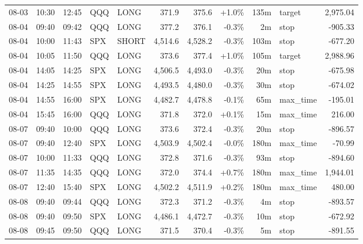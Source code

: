 \documentclass[11pt,a4paper,twoside]{article}
\begin{document}
\begin{center}
\begin{longtable}{>{\color{txtmain}}l l l l l r r r r >{\color{txtmain}}l r}
08-03 & 10:30 & 12:45 & QQQ & LONG & 371.9 & 375.6 & \textcolor{wingreen}{+1.0\%} & 135m & target & \textcolor{wingreen}{2,975.04} \\
08-04 & 09:40 & 09:42 & QQQ & LONG & 377.2 & 376.1 & \textcolor{lossred}{-0.3\%} & 2m & stop & \textcolor{lossred}{-905.33} \\
08-04 & 10:00 & 11:43 & SPX & SHORT & 4,514.6 & 4,528.2 & \textcolor{lossred}{-0.3\%} & 103m & stop & \textcolor{lossred}{-677.20} \\
08-04 & 10:05 & 11:50 & QQQ & LONG & 373.6 & 377.4 & \textcolor{wingreen}{+1.0\%} & 105m & target & \textcolor{wingreen}{2,988.96} \\
08-04 & 14:05 & 14:25 & SPX & LONG & 4,506.5 & 4,493.0 & \textcolor{lossred}{-0.3\%} & 20m & stop & \textcolor{lossred}{-675.98} \\
08-04 & 14:25 & 14:55 & SPX & LONG & 4,493.5 & 4,480.0 & \textcolor{lossred}{-0.3\%} & 30m & stop & \textcolor{lossred}{-674.02} \\
08-04 & 14:55 & 16:00 & SPX & LONG & 4,482.7 & 4,478.8 & \textcolor{lossred}{-0.1\%} & 65m & max\_time & \textcolor{lossred}{-195.01} \\
08-04 & 15:45 & 16:00 & QQQ & LONG & 371.8 & 372.0 & \textcolor{wingreen}{+0.1\%} & 15m & max\_time & \textcolor{wingreen}{216.00} \\
08-07 & 09:40 & 10:00 & QQQ & LONG & 373.6 & 372.4 & \textcolor{lossred}{-0.3\%} & 20m & stop & \textcolor{lossred}{-896.57} \\
08-07 & 09:40 & 12:40 & SPX & LONG & 4,503.9 & 4,502.4 & \textcolor{lossred}{-0.0\%} & 180m & max\_time & \textcolor{lossred}{-70.99} \\
08-07 & 10:00 & 11:33 & QQQ & LONG & 372.8 & 371.6 & \textcolor{lossred}{-0.3\%} & 93m & stop & \textcolor{lossred}{-894.60} \\
08-07 & 11:35 & 14:35 & QQQ & LONG & 372.0 & 374.4 & \textcolor{wingreen}{+0.7\%} & 180m & max\_time & \textcolor{wingreen}{1,944.01} \\
08-07 & 12:40 & 15:40 & SPX & LONG & 4,502.2 & 4,511.9 & \textcolor{wingreen}{+0.2\%} & 180m & max\_time & \textcolor{wingreen}{480.00} \\
08-08 & 09:40 & 09:44 & QQQ & LONG & 372.3 & 371.2 & \textcolor{lossred}{-0.3\%} & 4m & stop & \textcolor{lossred}{-893.57} \\
08-08 & 09:40 & 09:50 & SPX & LONG & 4,486.1 & 4,472.7 & \textcolor{lossred}{-0.3\%} & 10m & stop & \textcolor{lossred}{-672.92} \\
08-08 & 09:45 & 09:50 & QQQ & LONG & 371.5 & 370.4 & \textcolor{lossred}{-0.3\%} & 5m & stop & \textcolor{lossred}{-891.55} \\

\end{longtable}
\end{center}
\end{document}
